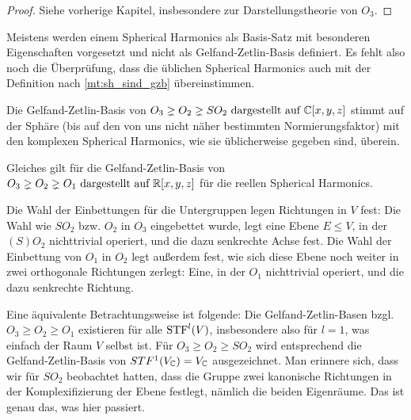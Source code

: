\begin{proof}
	Siehe vorherige Kapitel, insbesondere zur Darstellungstheorie von $O_3$.
\end{proof}

\begin{remark}
	Meistens werden einem Spherical Harmonics als Basis-Satz mit besonderen Eigenschaften vorgesetzt und nicht als Gelfand-Zetlin-Basis definiert. Es fehlt also noch die Überprüfung, dass die üblichen Spherical Harmonics auch mit der Definition nach \ref{mt:sh_sind_gzb} übereinstimmen.
\end{remark}

\begin{lemma}
	Die Gelfand-Zetlin-Basis von $O_3\gneq O_2\gneq SO_2 \text{ dargestellt auf } \mathbb{C}[x,y,z]$ stimmt auf der Sphäre (bis auf den von uns nicht näher bestimmten Normierungsfaktor) mit den komplexen Spherical Harmonics, wie sie üblicherweise gegeben sind, überein.
    
    Gleiches gilt für die Gelfand-Zetlin-Basis von $O_3\gneq O_2\gneq O_1 \text{ dargestellt auf } \mathbb{R}[x,y,z]$ für die reellen Spherical Harmonics.
\end{lemma}

\begin{remark}
Die Wahl der Einbettungen für die Untergruppen legen Richtungen in $V$ fest: Die Wahl wie $SO_2$ bzw. $O_2$ in $O_3$ eingebettet wurde, legt eine Ebene $E\leq V$, in der $(S)O_2$ nichttrivial operiert, und die dazu senkrechte Achse fest. Die Wahl der Einbettung von $O_1$ in $O_2$ legt außerdem fest, wie sich diese Ebene noch weiter in zwei orthogonale Richtungen zerlegt: Eine, in der $O_1$ nichttrivial operiert, und die dazu senkrechte Richtung.

\medbreak
Eine äquivalente Betrachtungsweise ist folgende: Die Gelfand-Zetlin-Basen bzgl. $O_3\geq O_2\geq O_1$ existieren für alle $\operatorname{STF}^l(V)$, insbesondere also für $l=1$, was einfach der Raum $V$ selbst ist. Für $O_3\geq O_2\geq SO_2$ wird entsprechend die Gelfand-Zetlin-Basis von $STF^1(V_{\mathbb{C}}) = V_{\mathbb{C}}$ ausgezeichnet. Man erinnere sich, dass wir für $SO_2$ beobachtet hatten, dass die Gruppe zwei kanonische Richtungen in der Komplexifizierung der Ebene festlegt, nämlich die beiden Eigenräume. Das ist genau das, was hier passiert.
\end{remark}

